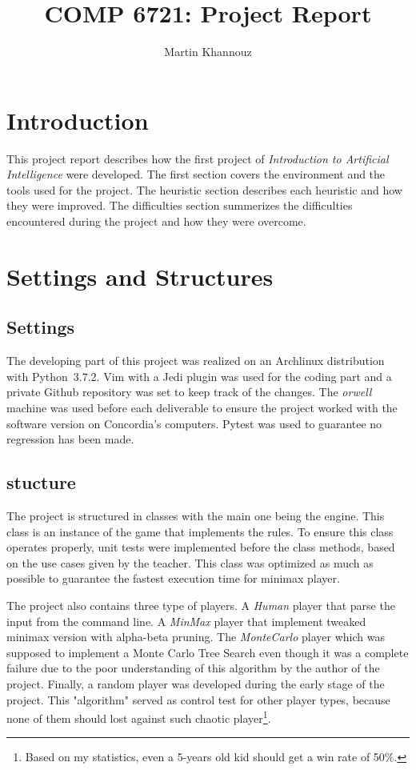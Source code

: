 \documentclass[runningheads]{llncs}
\begin{document}
%
\title{COMP 6721: Project Report}
\author{Martin Khannouz}
%
%
\maketitle              %
%
\section*{Introduction}
This project report describes how the first
project of \textit{Introduction to Artificial
Intelligence} were developed. The first section
covers the environment and the tools used for the
project. The heuristic section describes each
heuristic and how they were improved. The
difficulties section summerizes the difficulties
encountered during the project and how they were
overcome.

\section{Settings and Structures}
\subsection{Settings}
The developing part of this project was realized
on an Archlinux distribution with Python~3.7.2.
Vim with a Jedi plugin was used for the coding
part and a private Github repository was set to
keep track of the changes.
The \textit{orwell} machine was used before each
deliverable to ensure the project worked with the
software version on Concordia's computers. Pytest
was used to guarantee no regression has been made.

\subsection{stucture}
The project is structured in classes with
the main one being the engine. This class is an
instance of the game that implements the rules.
To ensure this class operates properly, unit tests
were implemented before the class methods, based on
the use cases given by the teacher.
This class was optimized as much as possible to
guarantee the fastest execution time for minimax
player.

The project also contains three type of players. A
\textit{Human} player that parse the input from the command
line. A \textit{MinMax} player that implement tweaked
minimax version with alpha-beta pruning. The
\textit{MonteCarlo} player which was supposed to implement
a Monte Carlo Tree Search even though it was a
complete failure due to the poor understanding of
this algorithm by the author of the project. Finally, a random player was
developed during the early stage of the project.
This "algorithm" served as control test for other
player types, because none of them should lost
against such chaotic player\footnote{Based on my
statistics, even a 5-years old kid should get a
win rate of 50\%.}.
\end{document}
